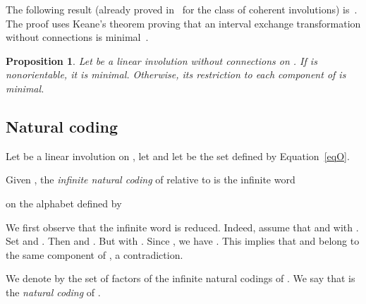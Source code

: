 \documentclass[preprint,12pt]{elsarticle}
\newtheorem{proposition}[theorem]{Proposition}
\numberwithin{theorem}{section}
\numberwithin{equation}{section}
\numberwithin{figure}{section}
\numberwithin{table}{section}
\begin{document}
The following result (already  proved in~\cite[Proposition 4.2]{BoissyLanneau2009}
 for the class of coherent involutions)
is~\cite[Proposition 3.7]{BertheDelecroixDolcePerrinReutenauerRindone2014}.
The proof uses Keane's theorem proving that an
interval exchange transformation without connections is minimal~\cite{Keane1975}. 
\begin{proposition}\label{propBL}
Let  be a linear involution without connections on . If 
is nonorientable, it is minimal. Otherwise, its restriction to each component
of  is minimal. 
\end{proposition}





\subsection{Natural coding}
Let  be a linear involution on , let  and let
 be the set defined by Equation~\eqref{eqO}.

Given , the \emph{infinite natural
  coding} of  relative to  is the infinite word

on the alphabet  defined by

We first observe that the infinite word  is
reduced. Indeed, assume that  and  with . Set  and . Then 
and . But  with . Since , we have . This implies that
 and  belong to the same component of , a contradiction.

We denote by  the set of factors of the infinite natural codings
of . We say that  is 
the \emph{natural coding} of . 
\end{document}
